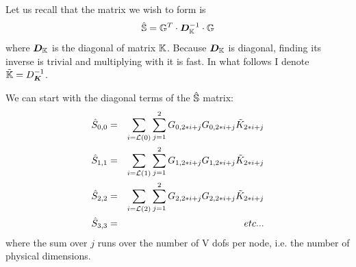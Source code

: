 Let us recall that the matrix we wish to form is 
\[
\hat{{\mathbb{S}}}={\mathbb{G}}^T \cdot {\bm D}_{\mathbb{K}}^{-1} \cdot {\mathbb{G}}
\]
where ${\bm D}_{\mathbb{K}}$ is the diagonal of matrix ${\mathbb{K}}$.
Because ${\bm D}_{\mathbb{K}}$ is diagonal, finding its inverse is trivial and multiplying with it is fast.
In what follows I denote $\tilde{{\mathbb{K}}}=D_{\bm K}^{-1}$.

We can start with the diagonal terms of the $\hat{{\mathbb{S}}}$ matrix:
\begin{eqnarray}
\hat{S}_{0,0} %
&=& \sum_{i={\cal L}(0)} \sum_{j=1}^2 G_{0,2*i+j} G_{0,2*i+j} \tilde{K}_{2*i+j} \nn\\
\hat{S}_{1,1} 
&=& \sum_{i={\cal L}(1)} \sum_{j=1}^2 G_{1,2*i+j} G_{1,2*i+j} \tilde{K}_{2*i+j}\nn\\
\hat{S}_{2,2} 
&=& \sum_{i={\cal L}(2)} \sum_{j=1}^2 G_{2,2*i+j} G_{2,2*i+j} \tilde{K}_{2*i+j}\nn\\
\hat{S}_{3,3} &=& etc ... 
\end{eqnarray}
where the sum over $j$ runs over the number of V dofs per node, i.e. the number of physical dimensions.

